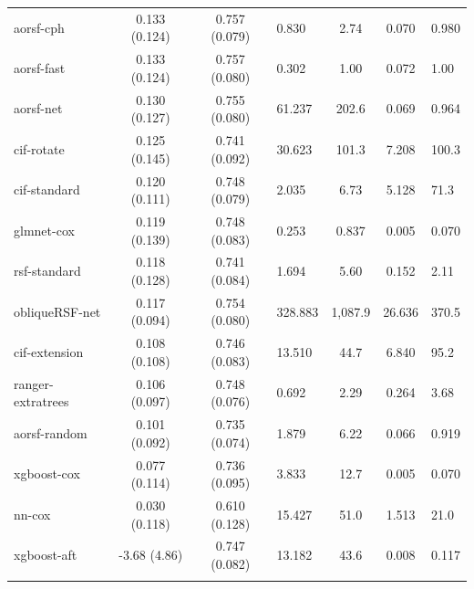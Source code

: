\documentclass[twoside,11pt]{article}\usepackage[]{graphicx}\usepackage[]{xcolor}
\newenvironment{knitrout}{}{} %
\begin{document}
\begin{knitrout}
\begin{longtable}{lcclccl}
\endfoot
\bottomrule
\endlastfoot
\addlinespace[0.3em]
\hline
\multicolumn{7}{l}{\textit{\textbf{Overall}}}\\
\hline
\hspace{1em}aorsf-cph & 0.133 (0.124) & 0.757 (0.079) & 0.830 & 2.74 & 0.070 & 0.980\\
\hspace{1em}aorsf-fast & 0.133 (0.124) & 0.757 (0.080) & 0.302 & 1.00 & 0.072 & 1.00\\
\hspace{1em}aorsf-net & 0.130 (0.127) & 0.755 (0.080) & 61.237 & 202.6 & 0.069 & 0.964\\
\hspace{1em}cif-rotate & 0.125 (0.145) & 0.741 (0.092) & 30.623 & 101.3 & 7.208 & 100.3\\
\hspace{1em}cif-standard & 0.120 (0.111) & 0.748 (0.079) & 2.035 & 6.73 & 5.128 & 71.3\\
\hspace{1em}glmnet-cox & 0.119 (0.139) & 0.748 (0.083) & 0.253 & 0.837 & 0.005 & 0.070\\
\hspace{1em}rsf-standard & 0.118 (0.128) & 0.741 (0.084) & 1.694 & 5.60 & 0.152 & 2.11\\
\hspace{1em}obliqueRSF-net & 0.117 (0.094) & 0.754 (0.080) & 328.883 & 1,087.9 & 26.636 & 370.5\\
\hspace{1em}cif-extension & 0.108 (0.108) & 0.746 (0.083) & 13.510 & 44.7 & 6.840 & 95.2\\
\hspace{1em}ranger-extratrees & 0.106 (0.097) & 0.748 (0.076) & 0.692 & 2.29 & 0.264 & 3.68\\
\hspace{1em}aorsf-random & 0.101 (0.092) & 0.735 (0.074) & 1.879 & 6.22 & 0.066 & 0.919\\
\hspace{1em}xgboost-cox & 0.077 (0.114) & 0.736 (0.095) & 3.833 & 12.7 & 0.005 & 0.070\\
\hspace{1em}nn-cox & 0.030 (0.118) & 0.610 (0.128) & 15.427 & 51.0 & 1.513 & 21.0\\
\hspace{1em}xgboost-aft & -3.68 (4.86) & 0.747 (0.082) & 13.182 & 43.6 & 0.008 & 0.117\\
\addlinespace[0.3em]
\hline
\multicolumn{7}{l}{\textit{\textbf{ACTG 320; AIDS diagnosis, n = 1151, p = 12}}}\\

\end{longtable}
\end{knitrout}
\end{document}
